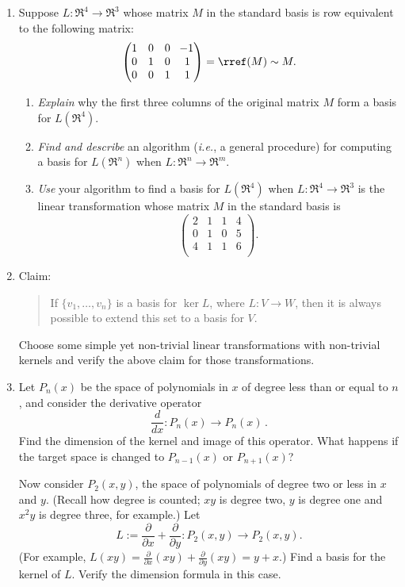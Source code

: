 \begin{enumerate}

\item Suppose $L \colon \Re^4\rightarrow \Re^3$ whose matrix $M$ in the standard basis is row equivalent to the following matrix:
\[
\begin{pmatrix}
1&0&0&\!-1\\
0&1&0&1\\
0&0&1&1\\
\end{pmatrix}=\rref(M)\sim M.
\]
\begin{enumerate}
\item \emph{Explain} why the first three columns of the original matrix $M$ form a basis for $L(\Re^4)$.
\item \emph{Find and describe} an algorithm (\textit{i.e.}, a general procedure) for computing a basis for $L(\Re^n)$ when $L \colon \Re^n\rightarrow \Re^m$. 
\item{\itshape Use} your algorithm to find a basis for \(L(\Re^4)\) when \(L \colon \Re^4 \to \Re^3\) is the linear transformation whose matrix \(M\) in the standard basis is
\[
\begin{pmatrix}
2&1&1&4\\
0&1&0&5\\
4&1&1&6\\
\end{pmatrix}.
\]
\end{enumerate}


\item Claim: 
\begin{quote}If $\{v_1, \ldots, v_n  \}$ is a basis for $\ker L$, where $L \colon V\rightarrow W$, then it is always possible to extend this set to a basis for $V$.\end{quote}  
Choose some simple yet non-trivial linear transformations with non-trivial kernels and verify the above claim for those transformations.


\item Let $P_n(x)$ be the space of polynomials in $x$ of degree less than or equal to $n$, and consider the derivative operator \[\frac{d}{dx}:P_n(x)\to P_n(x)\, .\] %
Find the dimension of the kernel and image of this operator. What happens if the target space is changed to $P_{n-1}(x)$ or $P_{n+1}(x)$?

Now consider $P_2(x,y)$, the space of polynomials of degree two or less in $x$ and $y$.  (Recall how degree is counted; $xy$ is degree two, $y$ is degree one and $x^2y$ is degree three, for example.)  Let 
\[L:=\frac{\partial}{\partial x}+\frac{\partial}{\partial y}:P_2(x,y) \to P_2(x,y).\]  
(For example, $L(xy)=\frac{\partial}{\partial x}(xy)+\frac{\partial}{\partial y}(xy) = y+x$.)  Find a basis for the kernel of $L$.  Verify the dimension formula in this case.


\end{enumerate}
